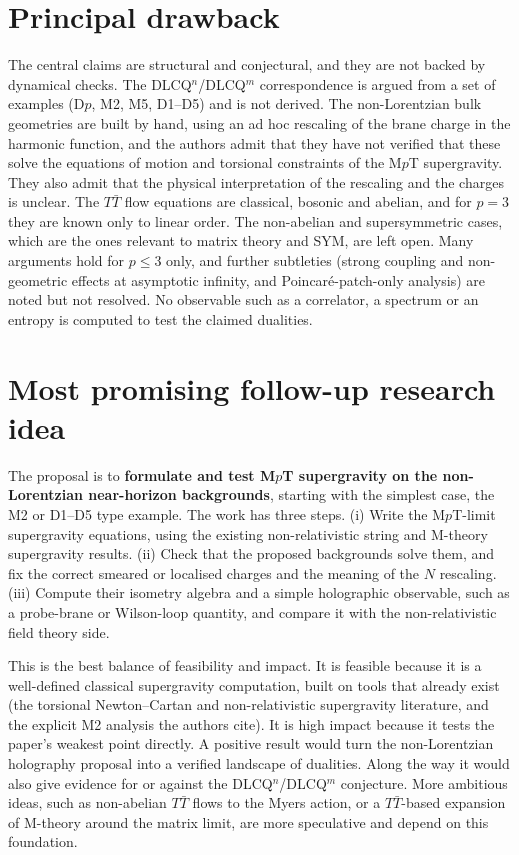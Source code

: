 \documentclass[11pt]{article}
\begin{document}
\section{Principal drawback}
The central claims are structural and conjectural, and they are not backed by dynamical checks. The DLCQ$^n$/DLCQ$^m$ correspondence is argued from a set of examples (D$p$, M2, M5, D1--D5) and is not derived. The non-Lorentzian bulk geometries are built by hand, using an ad hoc rescaling of the brane charge in the harmonic function, and the authors admit that they have not verified that these solve the equations of motion and torsional constraints of the M$p$T supergravity. They also admit that the physical interpretation of the rescaling and the charges is unclear. The $T\bar T$ flow equations are classical, bosonic and abelian, and for $p=3$ they are known only to linear order. The non-abelian and supersymmetric cases, which are the ones relevant to matrix theory and SYM, are left open. Many arguments hold for $p\le 3$ only, and further subtleties (strong coupling and non-geometric effects at asymptotic infinity, and Poincar\'e-patch-only analysis) are noted but not resolved. No observable such as a correlator, a spectrum or an entropy is computed to test the claimed dualities.

\section{Most promising follow-up research idea}
The proposal is to \textbf{formulate and test M$p$T supergravity on the non-Lorentzian near-horizon backgrounds}, starting with the simplest case, the M2 or D1--D5 type example. The work has three steps. (i) Write the M$p$T-limit supergravity equations, using the existing non-relativistic string and M-theory supergravity results. (ii) Check that the proposed backgrounds solve them, and fix the correct smeared or localised charges and the meaning of the $N$ rescaling. (iii) Compute their isometry algebra and a simple holographic observable, such as a probe-brane or Wilson-loop quantity, and compare it with the non-relativistic field theory side.

This is the best balance of feasibility and impact. It is feasible because it is a well-defined classical supergravity computation, built on tools that already exist (the torsional Newton--Cartan and non-relativistic supergravity literature, and the explicit M2 analysis the authors cite). It is high impact because it tests the paper's weakest point directly. A positive result would turn the non-Lorentzian holography proposal into a verified landscape of dualities. Along the way it would also give evidence for or against the DLCQ$^n$/DLCQ$^m$ conjecture. More ambitious ideas, such as non-abelian $T\bar T$ flows to the Myers action, or a $T\bar T$-based expansion of M-theory around the matrix limit, are more speculative and depend on this foundation.
\end{document}
